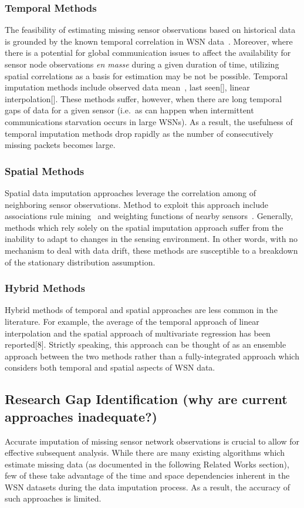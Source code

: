 \documentclass[10pt]{sigplan-proc-varsize-sensys11}
\begin{document}
\subsubsection{Temporal Methods}
The feasibility of estimating missing sensor observations based on historical data is grounded by the known temporal correlation in WSN data~\cite{akyildiz2004exploiting}.
Moreover, where there is a potential for global communication issues to affect the availability for sensor node observations \emph{en masse} during a given duration of time, utilizing spatial correlations as a basis for estimation may be not be possible.
Temporal imputation methods include observed data mean~\cite{madden2005tinydb,setz2009combining}, last seen[], linear interpolation[].
These methods suffer, however, when there are long temporal gaps of data for a given sensor (i.e.\ as can happen when intermittent communications starvation occurs in large WSNs).
As a result, the usefulness of temporal imputation methods drop rapidly as the number of consecutively missing packets becomes large.

\subsubsection{Spatial Methods}
Spatial data imputation approaches leverage the correlation among of neighboring sensor observations.
Method to exploit this approach include associations rule mining~\cite{le2005estimating,jiang2007estimating} and weighting functions of nearby sensors~\cite{li2008spatial,li2008data,pan2010k}.
Generally, methods which rely solely on the spatial imputation approach suffer from the inability to adapt to changes in the sensing environment.
In other words, with no mechanism to deal with data drift, these methods are susceptible to a breakdown of the stationary distribution assumption.

\subsubsection{Hybrid Methods}
Hybrid methods of temporal and spatial approaches are less common in the literature.
For example, the average of the temporal approach of linear interpolation and the spatial approach of multivariate regression has been reported[8].
Strictly speaking, this approach can be thought of as an ensemble approach between the two methods rather than a fully-integrated approach which considers both temporal and spatial aspects of WSN data.

\subsection{Research Gap Identification (why are current approaches inadequate?)}
Accurate imputation of missing sensor network observations is crucial to allow for effective subsequent analysis.
While there are many existing algorithms which estimate missing data (as documented in the following Related Works section), few of these take advantage of the time and space dependencies inherent in the WSN datasets during the data imputation process.
As a result, the accuracy of such approaches is limited.
\end{document}
